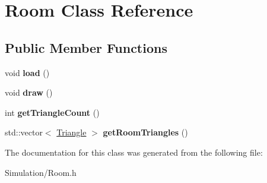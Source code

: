 \hypertarget{class_room}{}\section{Room Class Reference}
\label{class_room}
\subsection*{Public Member Functions}
\begin{DoxyCompactItemize}
\item 
\mbox{\label{class_room_a51424a2ca4f39eb25b701c07460cd5bc}} 
void {\bfseries load} ()
\item 
\mbox{\label{class_room_a40aeeb4083bfd0f84c2fc88ec1713230}} 
void {\bfseries draw} ()
\item 
\mbox{\label{class_room_a6bf70ed9beba2549a90e8dcb9540c019}} 
int {\bfseries get\+Triangle\+Count} ()
\item 
\mbox{\label{class_room_a44df6829c2387c12690d426ec319e9d0}} 
std\+::vector$<$ \hyperlink{class_triangle}{Triangle} $>$ {\bfseries get\+Room\+Triangles} ()
\end{DoxyCompactItemize}


The documentation for this class was generated from the following file\+:\begin{DoxyCompactItemize}
\item 
Simulation/Room.\+h\end{DoxyCompactItemize}
